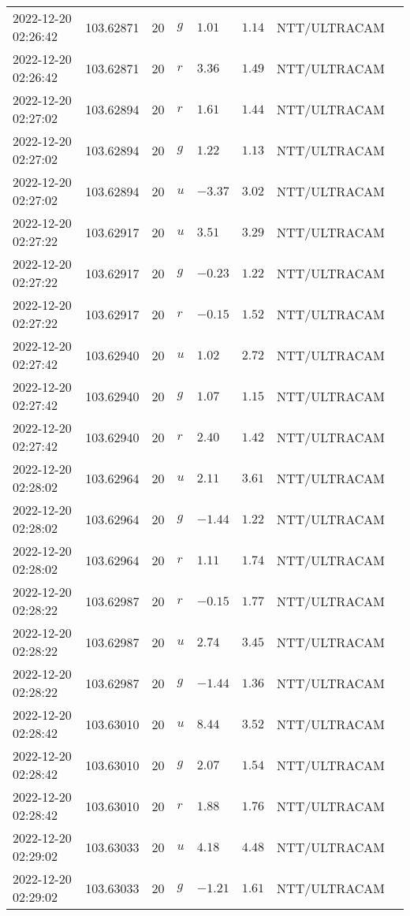 \documentclass{nature_plusfigure}
\begin{document}
\begin{supplement}
\begin{center}
\begin{longtable}{llllllll}
2022-12-20 02:26:42 & 103.62871 & 20 & $g$ & $1.01$ & $1.14$ & NTT/ULTRACAM &  \\ 
2022-12-20 02:26:42 & 103.62871 & 20 & $r$ & $3.36$ & $1.49$ & NTT/ULTRACAM &  \\ 
2022-12-20 02:27:02 & 103.62894 & 20 & $r$ & $1.61$ & $1.44$ & NTT/ULTRACAM &  \\ 
2022-12-20 02:27:02 & 103.62894 & 20 & $g$ & $1.22$ & $1.13$ & NTT/ULTRACAM &  \\ 
2022-12-20 02:27:02 & 103.62894 & 20 & $u$ & $-3.37$ & $3.02$ & NTT/ULTRACAM &  \\ 
2022-12-20 02:27:22 & 103.62917 & 20 & $u$ & $3.51$ & $3.29$ & NTT/ULTRACAM &  \\ 
2022-12-20 02:27:22 & 103.62917 & 20 & $g$ & $-0.23$ & $1.22$ & NTT/ULTRACAM &  \\ 
2022-12-20 02:27:22 & 103.62917 & 20 & $r$ & $-0.15$ & $1.52$ & NTT/ULTRACAM &  \\ 
2022-12-20 02:27:42 & 103.62940 & 20 & $u$ & $1.02$ & $2.72$ & NTT/ULTRACAM &  \\ 
2022-12-20 02:27:42 & 103.62940 & 20 & $g$ & $1.07$ & $1.15$ & NTT/ULTRACAM &  \\ 
2022-12-20 02:27:42 & 103.62940 & 20 & $r$ & $2.40$ & $1.42$ & NTT/ULTRACAM &  \\ 
2022-12-20 02:28:02 & 103.62964 & 20 & $u$ & $2.11$ & $3.61$ & NTT/ULTRACAM &  \\ 
2022-12-20 02:28:02 & 103.62964 & 20 & $g$ & $-1.44$ & $1.22$ & NTT/ULTRACAM &  \\ 
2022-12-20 02:28:02 & 103.62964 & 20 & $r$ & $1.11$ & $1.74$ & NTT/ULTRACAM &  \\ 
2022-12-20 02:28:22 & 103.62987 & 20 & $r$ & $-0.15$ & $1.77$ & NTT/ULTRACAM &  \\ 
2022-12-20 02:28:22 & 103.62987 & 20 & $u$ & $2.74$ & $3.45$ & NTT/ULTRACAM &  \\ 
2022-12-20 02:28:22 & 103.62987 & 20 & $g$ & $-1.44$ & $1.36$ & NTT/ULTRACAM &  \\ 
2022-12-20 02:28:42 & 103.63010 & 20 & $u$ & $8.44$ & $3.52$ & NTT/ULTRACAM &  \\ 
2022-12-20 02:28:42 & 103.63010 & 20 & $g$ & $2.07$ & $1.54$ & NTT/ULTRACAM &  \\ 
2022-12-20 02:28:42 & 103.63010 & 20 & $r$ & $1.88$ & $1.76$ & NTT/ULTRACAM &  \\ 
2022-12-20 02:29:02 & 103.63033 & 20 & $u$ & $4.18$ & $4.48$ & NTT/ULTRACAM &  \\ 
2022-12-20 02:29:02 & 103.63033 & 20 & $g$ & $-1.21$ & $1.61$ & NTT/ULTRACAM &  \\ 

\end{longtable}
\end{center}
\end{supplement}
\end{document}
